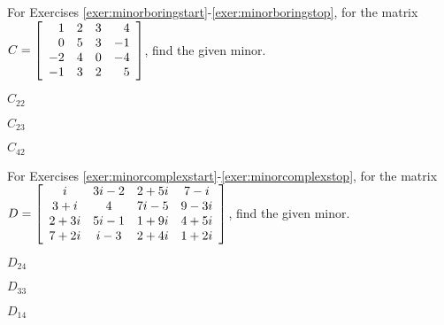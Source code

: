 \noindent For Exercises \ref{exer:minorboringstart}-\ref{exer:minorboringstop}, for the matrix $C = \mtx{rrrr}{1&2&3&4\\0&5&3&-1\\-2&4&0&-4\\-1&3&2&5}$, find the given minor.
\begin{enumerate}[!HW!]
\begin{multicols}{3}
\item\label{exer:minorboringstart} $C_{22}$
\item $C_{23}$
\item\label{exer:minorboringstop} $C_{42}$
\end{multicols}
\end{enumerate}

\noindent For Exercises \ref{exer:minorcomplexstart}-\ref{exer:minorcomplexstop}, for the matrix $D = \mtx{cccc}{i&3i-2&2+5i&7-i\\3+i&4&7i-5&9-3i\\2+3i&5i-1&1+9i&4+5i\\7+2i&i-3&2+4i&1+2i}$, find the given minor.
\begin{enumerate}[!HW!]
\begin{multicols}{3}
\item\label{exer:minorcomplexstart} $D_{24}$%
\item $D_{33}$%
\item\label{exer:minorcomplexstop} $D_{14}$%
\end{multicols}
\end{enumerate}


